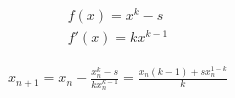 \documentclass{../style}
\begin{document}
\begin{gather*}
	f(x) = x^k - s \\
	f'(x) = kx^{k - 1}
\end{gather*}

\begin{gather*}
	x_{n + 1} = x_n - \frac{x_n^k - s}{kx_n^{k - 1}} = \frac{x_n(k - 1) + sx_n^{1 - k}}{k}
\end{gather*}
\end{document}
